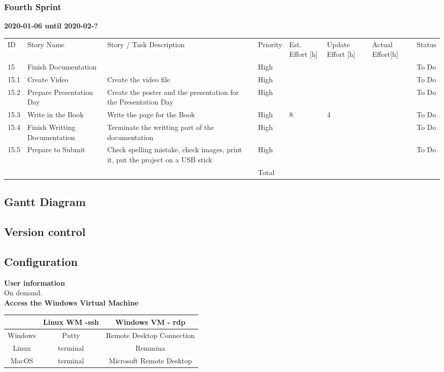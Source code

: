\documentclass{scrartcl}
\begin{document}
\subsubsection{Fourth Sprint}
\textbf{2020-01-06 until 2020-02-?}
\begin{longtable}{p{5mm}|p{2cm}|p{4cm}|p{1cm}|p{1cm}|p{1cm}|p{1cm}|p{1cm}}
  ID                     & Story Name & Story / Task Description & Priority & Est. Effort {[}h{]} & Update Effort {[}h{]} & Actual Effort{[}h{]} & Status                \\ 
  15 & Finish Documentation &  & High &  &  &  & To Do} \\
  15.1 & Create Video & Create the video file & High &  &  &  & To Do} \\ 
  15.2 & Prepare Presentation Day & Create the poster and the presentation for the Presentation Day & High &  &  &  & To Do} \\
  15.3 & Write in the Book & Write the page for the Book & High & 8 & 4 &  & To Do} \\ 
  15.4 & Finish Writting Documentation & Terminate the writting part of the documentation & High &  &  &  & To Do} \\ 
  15.5 & Prepare to Submit & Check spelling mistake, check images, print it, put the project on a USB stick & High &  &  &  & To Do} \\ \hline
   &  &  & Total &  &  &  & } \\ 
\end{longtable}

\subsection{Gantt Diagram}


\subsection{Version control}

\subsection{Configuration}

\textbf{User information} \\
On demand.\\

\textbf{Access the Windows Virtual Machine}\\
\begin{center}
  \begin{tabular}{|c|c|c|}
    \hline
     & Linux WM -ssh & Windows VM - rdp \\
    \hline
    Windows & Putty & Remote Desktop Connection \\
    \hline
    Linux & terminal & Remmina \\
    \hline
    MacOS & terminal & Microsoft Remote Desktop \\
    \hline
  \end{tabular}
\end{center}\\
\end{document}
